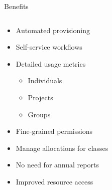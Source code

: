\documentclass[aspectratio=169]{beamer}
\begin{document}
\begin{frame}{Benefits}
\small
\begin{columns}[c]
\begin{column}{0.5\textwidth}
\begin{itemize}
\item<1-| alert@1> Automated provisioning
\item<2-| alert@2> Self-service workflows
\item<3-| alert@3> Detailed usage metrics
\begin{itemize}
\item<4-| alert@4> Individuals
\item<5-| alert@5> Projects
\item<6-| alert@6> Groups
\end{itemize}
\item<7-| alert@7> Fine-grained permissions
\item<8-| alert@8> Manage allocations for classes
\item<9-| alert@9> No need for annual reports
\item<10-| alert@10> Improved resource access
\end{itemize}
\end{column}
\begin{column}{0.5\textwidth}
\centering
{}
\end{column}
\end{columns}
\end{frame}
\end{document}
